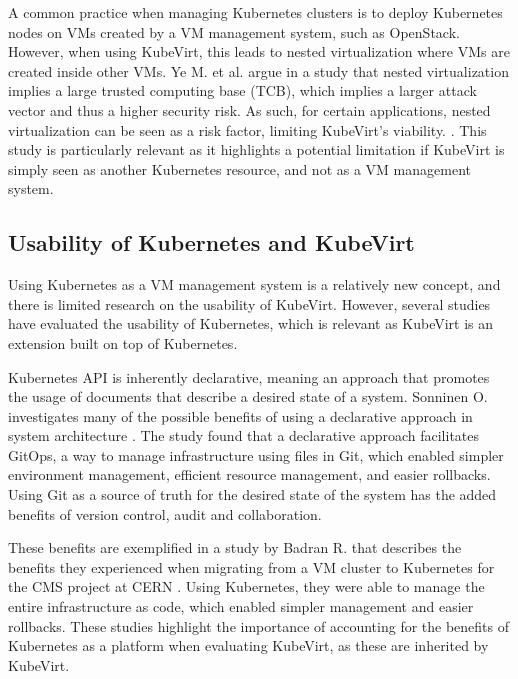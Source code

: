 \documentclass{article}
\begin{document}
A common practice when managing Kubernetes clusters is to deploy Kubernetes nodes on VMs created by a VM management system, such as OpenStack. However, when using KubeVirt, this leads to nested virtualization where VMs are created inside other VMs. Ye M. et al. argue in a study that nested virtualization implies a large trusted computing base (TCB), which implies a larger attack vector and thus a higher security risk. As such, for certain applications, nested virtualization can be seen as a risk factor, limiting KubeVirt's viability. \cite{free-the-turtles}. This study is particularly relevant as it highlights a potential limitation if KubeVirt is simply seen as another Kubernetes resource, and not as a VM management system. 

\subsection{Usability of Kubernetes and KubeVirt}
Using Kubernetes as a VM management system is a relatively new concept, and there is limited research on the usability of KubeVirt. However, several studies have evaluated the usability of Kubernetes, which is relevant as KubeVirt is an extension built on top of Kubernetes.

Kubernetes API is inherently declarative, meaning an approach that promotes the usage of documents that describe a desired state of a system. Sonninen O. investigates many of the possible benefits of using a declarative approach in system architecture \cite{declarative-benefits}. The study found that a declarative approach facilitates GitOps, a way to manage infrastructure using files in Git, which enabled simpler environment management, efficient resource management, and easier rollbacks. Using Git as a source of truth for the desired state of the system has the added benefits of version control, audit and collaboration.

These benefits are exemplified in a study by Badran R. that describes the benefits they experienced when migrating from a VM cluster to Kubernetes for the CMS project at CERN \cite{k8s-cern}. Using Kubernetes, they were able to manage the entire infrastructure as code, which enabled simpler management and easier rollbacks. These studies highlight the importance of accounting for the benefits of Kubernetes as a platform when evaluating KubeVirt, as these are inherited by KubeVirt.
\end{document}
